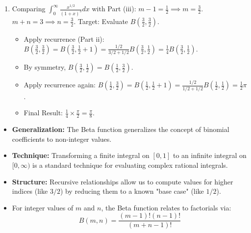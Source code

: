 \begin{solution}
\begin{enumerate}
	\item[(iv)] Comparing $\int_0^\infty \frac{x^{1/2}}{(1+x)^3} dx$ with Part (iii):
	$m-1 = \frac{1}{2} \implies m = \frac{3}{2}$. $m+n = 3 \implies n = \frac{3}{2}$.
	Target: Evaluate $B(\frac{3}{2}, \frac{3}{2})$.
	\begin{itemize}
		\item Apply recurrence (Part ii): $B(\frac{3}{2}, \frac{3}{2}) = B(\frac{3}{2}, \frac{1}{2} + 1) = \frac{1/2}{3/2 + 1/2} B(\frac{3}{2}, \frac{1}{2}) = \frac{1}{4} B(\frac{3}{2}, \frac{1}{2})$.
		\item By symmetry, $B(\frac{3}{2}, \frac{1}{2}) = B(\frac{1}{2}, \frac{3}{2})$.
		\item Apply recurrence again: $B(\frac{1}{2}, \frac{3}{2}) = B(\frac{1}{2}, \frac{1}{2} + 1) = \frac{1/2}{1/2 + 1/2} B(\frac{1}{2}, \frac{1}{2}) = \frac{1}{2} \pi$.
		\item Final Result: $\frac{1}{4} \times \frac{\pi}{2} = \frac{\pi}{8}$.
	\end{itemize}
\end{enumerate}
\end{solution}

\begin{takeaways}
\begin{itemize}
	\item \textbf{Generalization:} The Beta function generalizes the concept of binomial coefficients to non-integer values.
	\item \textbf{Technique:} Transforming a finite integral on $[0,1]$ to an infinite integral on $[0, \infty)$ is a standard technique for evaluating complex rational integrals.
	\item \textbf{Structure:} Recursive relationships allow us to compute values for higher indices (like $3/2$) by reducing them to a known "base case" (like $1/2$).
	\item For integer values of $m$ and $n$, the Beta function relates to factorials via:
            $$ B(m, n) = \frac{(m-1)!(n-1)!}{(m+n-1)!} $$ 
\end{itemize}
\end{takeaways}
